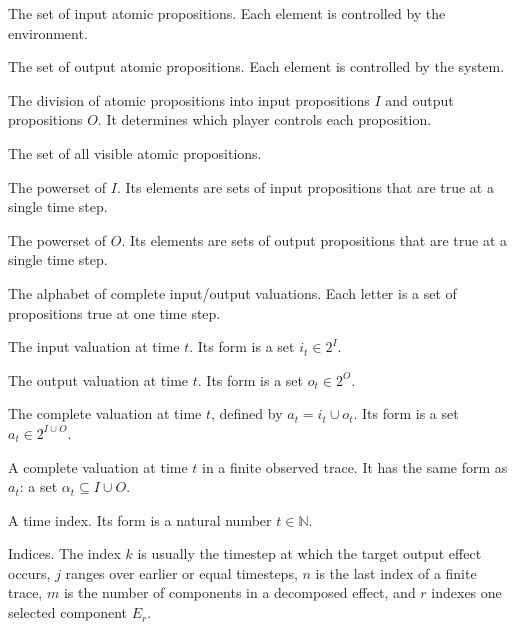 \documentclass[11pt]{article}
\theoremstyle{remark}
\newcommand{\Nat}{\mathbb{N}}
\begin{document}
\begin{description}[leftmargin=2.8cm,style=nextline]
  \item[\(I\)]
  The set of input atomic propositions. Each element is controlled by the
  environment.

  \item[\(O\)]
  The set of output atomic propositions. Each element is controlled by the
  system.

  \item[\(I/O\text{ partition}\)]
  The division of atomic propositions into input propositions \(I\) and output
  propositions \(O\). It determines which player controls each proposition.

  \item[\(I\cup O\)]
  The set of all visible atomic propositions.

  \item[\(2^I\)]
  The powerset of \(I\). Its elements are sets of input propositions that are
  true at a single time step.

  \item[\(2^O\)]
  The powerset of \(O\). Its elements are sets of output propositions that are
  true at a single time step.

  \item[\(2^{I\cup O}\)]
  The alphabet of complete input/output valuations. Each letter is a set of
  propositions true at one time step.

  \item[\(i_t\)]
  The input valuation at time \(t\). Its form is a set \(i_t\in 2^I\).

  \item[\(o_t\)]
  The output valuation at time \(t\). Its form is a set \(o_t\in 2^O\).

  \item[\(a_t\)]
  The complete valuation at time \(t\), defined by \(a_t=i_t\cup o_t\). Its form
  is a set \(a_t\in 2^{I\cup O}\).

  \item[\(\alpha_t\)]
  A complete valuation at time \(t\) in a finite observed trace. It has the same
  form as \(a_t\): a set \(\alpha_t\subseteq I\cup O\).

  \item[\(t\)]
  A time index. Its form is a natural number \(t\in\Nat\).

  \item[\(j,k,n,m,r\)]
  Indices. The index \(k\) is usually the timestep at which the target output
  effect occurs, \(j\) ranges over earlier or equal timesteps, \(n\) is the last
  index of a finite trace, \(m\) is the number of components in a decomposed
  effect, and \(r\) indexes one selected component \(E_r\).


\end{description}
\end{document}
